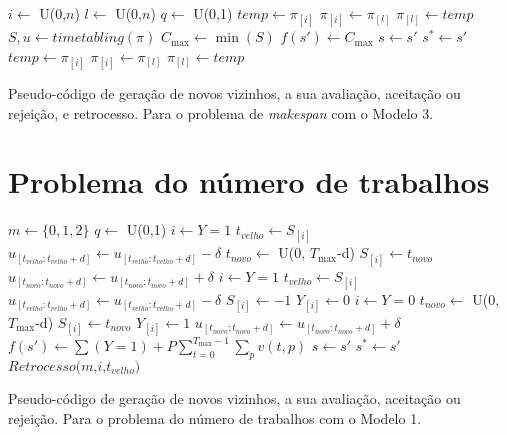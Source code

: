 \begin{algorithm}[H]
\label{algo:P1M2_GV_main_algo}
	$i \gets$ U(0,$n$)\;
	$l \gets$ U(0,$n$)\;
    $q \gets$ U(0,1)\;
    $\textit{temp} \gets \pi_{[i]}$\;
	$\pi_{[i]} \gets \pi_{[l]}$\;
	$\pi_{[l]} \gets \textit{temp}$\;
	$S, u \gets \textit{timetabling}(\pi)$\;
    $C_{\max} \gets \min(S)$\;
    $f(s') \gets C_{\max}$\;
	{
		$s \gets s'$\;
		{
			$s^* \gets s'$
		}
	}
	\Else
	{
    	$\textit{temp} \gets \pi_{[i]}$\;
		$\pi_{[i]} \gets \pi_{[l]}$\;
		$\pi_{[l]} \gets \textit{temp}$\;
	}    
    \caption{Pseudo-código de geração de novos vizinhos, a sua avaliação, aceitação ou rejeição, e retrocesso. Para o problema de \textit{makespan} com o Modelo 3.}
\end{algorithm}




\section{Problema do número de trabalhos}

\begin{algorithm}[H]
\label{algo:P2M1_main_algo}
	$m \gets \{0,1,2\}$\;
	$q \gets$ U(0,1)\;
	{
		$i \gets Y=1$\;
		$t_{velho} \gets S_{[i]}$\;
    	$u_{[t_{velho}: t_{velho}+d]} \gets u_{[t_{velho}: t_{velho}+d]} - \delta$\;
    	$t_{novo} \gets$ U(0, $T_{\max}$-d)\;
    	$S_{[i]} \gets t_{novo}$\;
    	$u_{[t_{novo}: t_{novo}+d]} \gets u_{[t_{novo}: t_{novo}+d]} + \delta$\;
	}
	{
		$i \gets Y=1$\;
		$t_{velho} \gets S_{[i]}$\;
		$u_{[t_{velho}: t_{velho}+d]} \gets u_{[t_{velho}: t_{velho}+d]} - \delta$\;
		$S_{[i]} \gets -1$\;
		$Y_{[i]} \gets 0$\;
	}
	{
		$i \gets Y=0$\;
		$t_{novo} \gets$ U(0, $T_{\max}$-d)\;
		$S_{[i]} \gets t_{novo}$\;
		$Y_{[i]} \gets 1$\;
		$u_{[t_{novo}: t_{novo}+d]} \gets u_{[t_{novo}: t_{novo}+d]} + \delta$\;
	}
    $f(s') \gets \sum (Y=1) + P \sum_{t=0}^{T_{\max}-1}\sum_{p}v(t,p)$\;
	{
		$s \gets s'$\;
		{
			$s^* \gets s'$
		}
	}
	\Else
	{
		$\textit{Retrocesso(m,i,}t_{velho})$\;
	}
    \caption{Pseudo-código de geração de novos vizinhos, a sua avaliação, aceitação ou rejeição. Para o problema do número de trabalhos com o Modelo 1.}
\end{algorithm}

